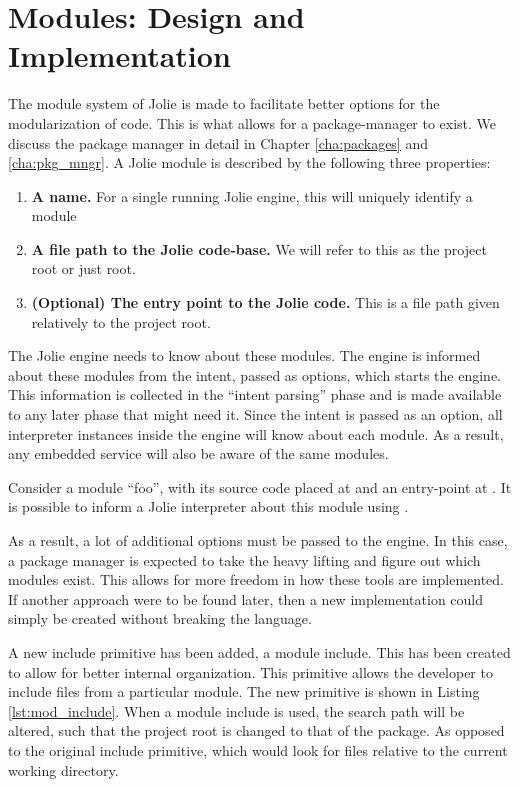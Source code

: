 \section{Modules: Design and Implementation}

The module system of Jolie is made to facilitate better options for the
modularization of code. This is what allows for a package-manager to exist. We
discuss the package manager in detail in Chapter \ref{cha:packages} and
\ref{cha:pkg_mngr}. A Jolie module is described by the following three
properties:

\begin{enumerate}

    \item \textbf{A name.} For a single running Jolie engine, this will
    uniquely identify a module

    \item \textbf{A file path to the Jolie code-base.} We will refer to this as
    the project root or just root.

    \item \textbf{(Optional) The entry point to the Jolie code.} This is a file
    path given relatively to the project root.

\end{enumerate}

The Jolie engine needs to know about these modules. The engine is informed
about these modules from the intent, passed as options, which starts the
engine. This information is collected in the ``intent parsing'' phase and is
made available to any later phase that might need it.  Since the intent is
passed as an option, all interpreter instances inside the engine will know
about each module.  As a result, any embedded service will also be aware of the
same modules.

Consider a module ``foo'', with its source code placed at 
and an entry-point at . It is possible to inform a
Jolie interpreter about this module using
.

As a result, a lot of additional options must be passed to the engine. In this
case, a package manager is expected to take the heavy lifting and figure out
which modules exist.  This allows for more freedom in how these tools are
implemented. If another approach were to be found later, then a new
implementation could simply be created without breaking the language.

A new include primitive has been added, a module include. This has been created
to allow for better internal organization. This primitive allows the developer
to include files from a particular module. The new primitive is shown in
Listing \ref{lst:mod_include}. When a module include is used, the search path
will be altered, such that the project root is changed to that of the package.
As opposed to the original include primitive, which would look for files
relative to the current working directory.

